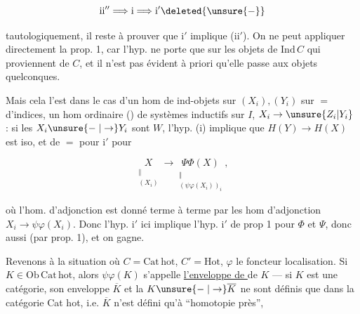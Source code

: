 
\[
 \mathrm{ii}''\Longrightarrow\mathrm{i}\Longrightarrow\mathrm{i}'\deleted{\unsure{\relbar}}
\]

tautologiquement, il reste à prouver que i$'$ implique  (ii$'$). On ne peut appliquer directement la prop. 1, car l'hyp.   ne porte que sur les objets de $\mathrm{Ind}\,C$ qui proviennent de $C$, et il n'est pas évident à priori qu'elle passe aux objets quelconques.

Mais cela l'est dans le cas d'un hom de ind-objets sur  $(X_i),(Y_i)$ sur  $=$  d'indices,    un  hom ordinaire () de  systèmes inductifs sur $I$, $X_i\to\unsure{Z_i|Y_i}$ :  si les $X_i\unsure{\relbar|\to}Y_i$ sont  $W$, l'hyp. (i) implique que $H(Y)\to H(X)$ est iso, et de $=$ pour i$'$ pour

\[
 \underset{\substack{\Vert\\(X_i)}}{X}\longrightarrow
 \underset{\substack{\Vert\\(\psi\varphi(X_i))_i}}{\Psi\Phi(X)} ,
\]

où l'hom. d'adjonction est donné terme à terme par les hom d'adjonction $X_i\longrightarrow\psi\varphi(X_i)$. Donc l'hyp. i$'$  ici implique l'hyp. i$'$ de prop 1 pour $\Phi$ et $\Psi$, donc aussi  (par prop. 1), et on gagne.


Revenons à la situation où $C=\mathrm{Cat\,hot}$, $C'=\mathrm{Hot}$, $\varphi$ le foncteur localisation. Si $K\in\mathrm{Ob}\,\mathrm{Cat\,hot}$, alors $\psi\varphi(K)$ s'appelle \uline{l'enveloppe de } de $K$ --- si $K$ est une catégorie, son enveloppe $\overline K$  et la  $K\unsure{\relbar|\to}\overline K$ ne sont définis que dans la catégorie Cat hot, i.e. $\overline K$ n'est défini qu'à ``homotopie près'',

